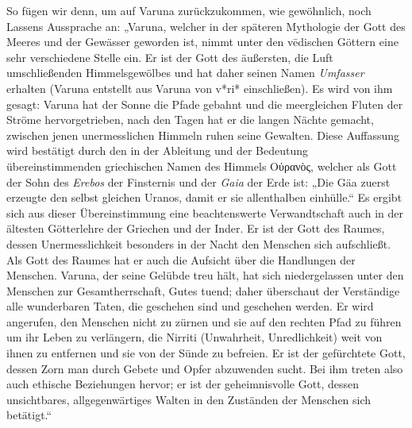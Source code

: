 \documentclass{article}
\begin{document}
So fügen wir denn, um auf Varuna zurückzukommen, wie gewöhnlich, noch Lassens Aussprache an: „Varuna, welcher in der späteren Mythologie der Gott des Meeres und der Gewässer geworden ist, nimmt unter den v\={e}dischen Göttern eine sehr verschiedene Stelle ein. Er ist der Gott des äußersten, die Luft umschließenden Himmelsgewölbes und hat daher seinen Namen \emph{Umfasser} erhalten (Varuna entstellt aus Varuna von v*ri* einschließen). Es wird von ihm gesagt: Varuna hat der Sonne die Pfade gebahnt und die meergleichen Fluten der Ströme hervorgetrieben, nach den Tagen hat er die langen Nächte gemacht, zwischen jenen unermesslichen Himmeln ruhen seine Gewalten. Diese Auffassung wird bestätigt durch den in der Ableitung und der Bedeutung übereinstimmenden griechischen Namen des Himmels \textgreek{Οὐρανὸς}, welcher als Gott der Sohn des \emph{Erebos} der Finsternis und der \emph{Gaia} der Erde ist: „Die Gäa zuerst erzeugte den selbst gleichen Uranos, damit er sie allenthalben einhülle.“ Es ergibt sich aus dieser Übereinstimmung eine beachtenswerte Verwandtschaft auch in der ältesten Götterlehre der Griechen und der Inder. Er ist der Gott des Raumes, dessen Unermesslichkeit besonders in der Nacht den Menschen sich aufschließt. Als Gott des Raumes hat er auch die Aufsicht über die Handlungen der Menschen. Varuna, der seine Gelübde treu hält, hat sich niedergelassen unter den Menschen zur Gesamtherrschaft, Gutes tuend; daher überschaut der Verständige alle wunderbaren Taten, die geschehen sind und geschehen werden. Er wird angerufen, den Menschen nicht zu zürnen und sie auf den rechten Pfad zu führen um ihr Leben zu verlängern, die Nirriti (Unwahrheit, Unredlichkeit) weit von ihnen zu entfernen und sie von der Sünde zu befreien. Er ist der gefürchtete Gott, dessen Zorn man durch Gebete und Opfer abzuwenden sucht. Bei ihm treten also auch ethische Beziehungen hervor; er ist der geheimnisvolle Gott, dessen unsichtbares, allgegenwärtiges Walten in den Zuständen der Menschen sich betätigt.“
\end{document}
